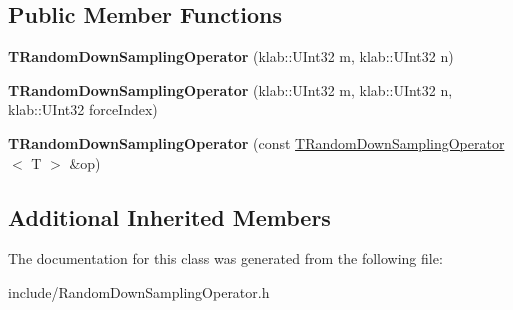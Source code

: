 \subsection*{Public Member Functions}
\begin{DoxyCompactItemize}
\item 
{\bfseries T\+Random\+Down\+Sampling\+Operator} (klab\+::\+U\+Int32 m, klab\+::\+U\+Int32 n)\hypertarget{classkl1p_1_1TRandomDownSamplingOperator_a8ace9b723200de113955058dcbda12dc}{}\label{classkl1p_1_1TRandomDownSamplingOperator_a8ace9b723200de113955058dcbda12dc}

\item 
{\bfseries T\+Random\+Down\+Sampling\+Operator} (klab\+::\+U\+Int32 m, klab\+::\+U\+Int32 n, klab\+::\+U\+Int32 force\+Index)\hypertarget{classkl1p_1_1TRandomDownSamplingOperator_addede1d2a253f45ccf74c49463200f54}{}\label{classkl1p_1_1TRandomDownSamplingOperator_addede1d2a253f45ccf74c49463200f54}

\item 
{\bfseries T\+Random\+Down\+Sampling\+Operator} (const \hyperlink{classkl1p_1_1TRandomDownSamplingOperator}{T\+Random\+Down\+Sampling\+Operator}$<$ T $>$ \&op)\hypertarget{classkl1p_1_1TRandomDownSamplingOperator_a0dc2326e6ded7db1cc303f01603a7554}{}\label{classkl1p_1_1TRandomDownSamplingOperator_a0dc2326e6ded7db1cc303f01603a7554}

\end{DoxyCompactItemize}
\subsection*{Additional Inherited Members}


The documentation for this class was generated from the following file\+:\begin{DoxyCompactItemize}
\item 
include/Random\+Down\+Sampling\+Operator.\+h\end{DoxyCompactItemize}
